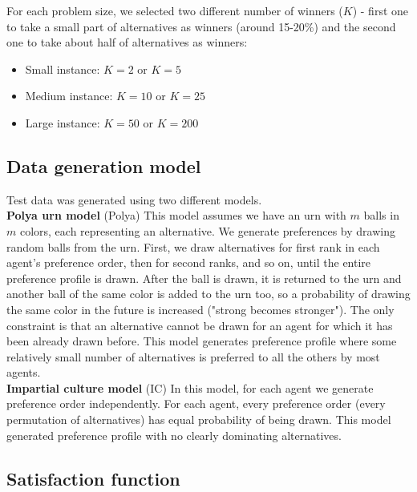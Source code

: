 For each problem size, we selected two different number of winners ($K$) - first one to take a small part of alternatives as winners (around 15-20\%) and the second one to take about half of alternatives as winners:
\begin{itemize}
	\item Small instance: $K = 2$ or $K = 5$
	\item Medium instance: $K = 10$ or $K = 25$
	\item Large instance: $K = 50$ or $K = 200$
\end{itemize}

\subsection{Data generation model}

Test data was generated using two different models.
\\

\noindent
\textbf{Polya urn model} (Polya) \hspace{.1in} This model assumes we have an urn with $m$ balls in $m$ colors, each representing an alternative. We generate preferences by drawing random balls from the urn. First, we draw alternatives for first rank in each agent's preference order, then for second ranks, and so on, until the entire preference profile is drawn. After the ball is drawn, it is returned to the urn and another ball of the same color is added to the urn too, so a probability of drawing the same color in the future is increased ("strong becomes stronger"). The only constraint is that an alternative cannot be drawn for an agent for which it has been already drawn before. This model generates preference profile where some relatively small number of alternatives is preferred to all the others by most agents.
\\

\noindent
\textbf{Impartial culture model} (IC) \hspace{.1in} In this model, for each agent we generate preference order independently. For each agent, every preference order (every permutation of alternatives) has equal probability of being drawn. This model generated preference profile with no clearly dominating alternatives.

\subsection{Satisfaction function}

